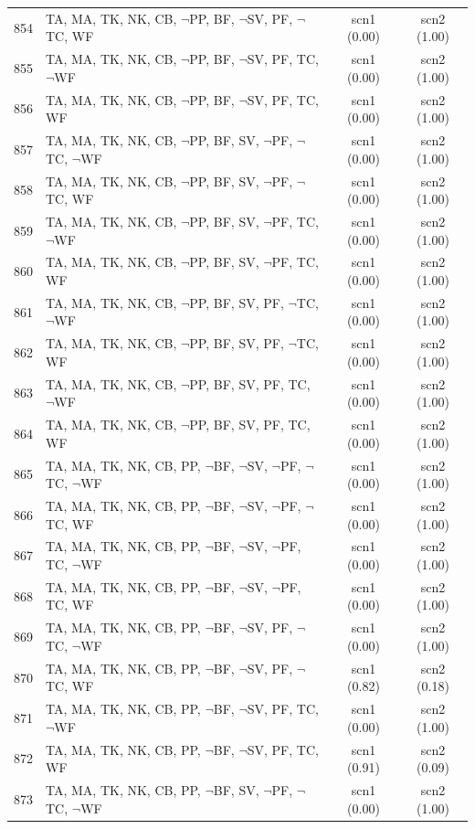 \documentclass[12pt]{article}
\begin{document}
\begin{longtable}{|l|l|c|c|}
854 & TA, MA, TK, NK, CB, $\neg$PP, BF, $\neg$SV, PF, $\neg$TC, WF & scn1 (0.00) & scn2 (1.00)\\
855 & TA, MA, TK, NK, CB, $\neg$PP, BF, $\neg$SV, PF, TC, $\neg$WF & scn1 (0.00) & scn2 (1.00)\\
856 & TA, MA, TK, NK, CB, $\neg$PP, BF, $\neg$SV, PF, TC, WF & scn1 (0.00) & scn2 (1.00)\\
857 & TA, MA, TK, NK, CB, $\neg$PP, BF, SV, $\neg$PF, $\neg$TC, $\neg$WF & scn1 (0.00) & scn2 (1.00)\\
858 & TA, MA, TK, NK, CB, $\neg$PP, BF, SV, $\neg$PF, $\neg$TC, WF & scn1 (0.00) & scn2 (1.00)\\
859 & TA, MA, TK, NK, CB, $\neg$PP, BF, SV, $\neg$PF, TC, $\neg$WF & scn1 (0.00) & scn2 (1.00)\\
860 & TA, MA, TK, NK, CB, $\neg$PP, BF, SV, $\neg$PF, TC, WF & scn1 (0.00) & scn2 (1.00)\\
861 & TA, MA, TK, NK, CB, $\neg$PP, BF, SV, PF, $\neg$TC, $\neg$WF & scn1 (0.00) & scn2 (1.00)\\
862 & TA, MA, TK, NK, CB, $\neg$PP, BF, SV, PF, $\neg$TC, WF & scn1 (0.00) & scn2 (1.00)\\
863 & TA, MA, TK, NK, CB, $\neg$PP, BF, SV, PF, TC, $\neg$WF & scn1 (0.00) & scn2 (1.00)\\
864 & TA, MA, TK, NK, CB, $\neg$PP, BF, SV, PF, TC, WF & scn1 (0.00) & scn2 (1.00)\\
865 & TA, MA, TK, NK, CB, PP, $\neg$BF, $\neg$SV, $\neg$PF, $\neg$TC, $\neg$WF & scn1 (0.00) & scn2 (1.00)\\
866 & TA, MA, TK, NK, CB, PP, $\neg$BF, $\neg$SV, $\neg$PF, $\neg$TC, WF & scn1 (0.00) & scn2 (1.00)\\
867 & TA, MA, TK, NK, CB, PP, $\neg$BF, $\neg$SV, $\neg$PF, TC, $\neg$WF & scn1 (0.00) & scn2 (1.00)\\
868 & TA, MA, TK, NK, CB, PP, $\neg$BF, $\neg$SV, $\neg$PF, TC, WF & scn1 (0.00) & scn2 (1.00)\\
869 & TA, MA, TK, NK, CB, PP, $\neg$BF, $\neg$SV, PF, $\neg$TC, $\neg$WF & scn1 (0.00) & scn2 (1.00)\\
870 & TA, MA, TK, NK, CB, PP, $\neg$BF, $\neg$SV, PF, $\neg$TC, WF & scn1 (0.82) & scn2 (0.18)\\
871 & TA, MA, TK, NK, CB, PP, $\neg$BF, $\neg$SV, PF, TC, $\neg$WF & scn1 (0.00) & scn2 (1.00)\\
872 & TA, MA, TK, NK, CB, PP, $\neg$BF, $\neg$SV, PF, TC, WF & scn1 (0.91) & scn2 (0.09)\\
873 & TA, MA, TK, NK, CB, PP, $\neg$BF, SV, $\neg$PF, $\neg$TC, $\neg$WF & scn1 (0.00) & scn2 (1.00)\\

\end{longtable}
\end{document}
